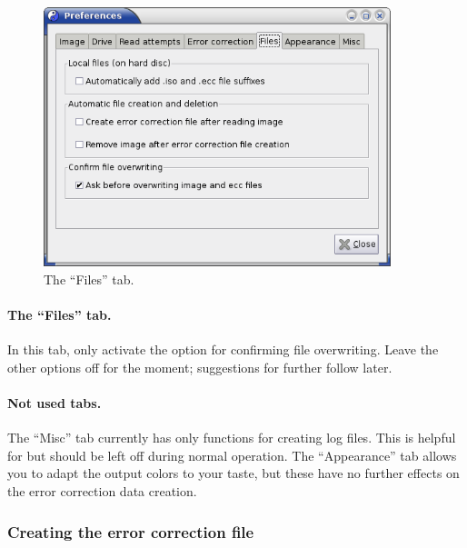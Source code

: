 \begin{figure}
\centerline{\includegraphics[width=0.9\textwidth]{screenshots/create-prefs-file.png}}
\caption{The ``Files'' tab.}  
\label{howto-eccfile-prefs-file}
\end{figure}

\paragraph{The ``Files'' tab.} In this tab, only
activate the option for confirming file overwriting.
Leave the other options off for the moment; suggestions for
further  follow later. 

\bigskip

\paragraph{Not used tabs.} The ``Misc'' tab currently has only functions
for creating log files. This is helpful
for  but
should be left off during normal operation. The ``Appearance'' tab allows
you to adapt the output colors to your taste, but these have no further
effects on the error correction data creation.

\newpage
\subsubsection{Creating the error correction file}
\label{howto-eccfile-create}

